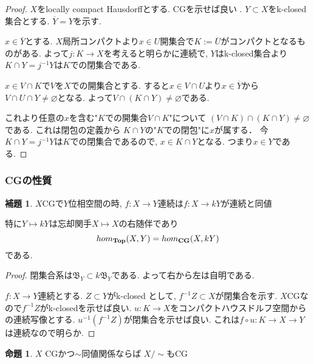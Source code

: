 \documentclass[dvipdfmx,a4paper,11pt]{report}
\theoremstyle{definition}
\newtheorem{lem}[thm]{補題}
\newtheorem{prop}[thm]{命題}
\begin{document}
\begin{proof}
 $X$をlocally compact Hausdorffとする.
CGを示せば良い .
$Y \subset X$をk-closed集合とする.
$\overline{Y} = Y$を示す.

$x \in \overline{Y}$とする.
$X$局所コンパクトより$x \in U$開集合で$K:= \overline{U}$がコンパクトとなるものがある.
よって$j : K \to X$を考えると明らかに連続で, $Y$はk-closed集合より$K\cap Y = j^{-1}Y$は$K$での閉集合である.

$x \in V \cap K$で$V$を$X$での開集合とする.
すると$x \in V \cap U$より$x \in \overline{Y}$から
$V \cap U \cap Y \neq\varnothing$となる.
よって$V \cap (K \cap Y)\neq\varnothing$である.

これより任意の$x$を含む"$K$での開集合$V \cap K$"について
$(V \cap K) \cap  (K \cap Y) \neq \varnothing$である.
これは閉包の定義から
$K \cap Y$の"$K$での閉包"に$x$が属する．
今$K\cap Y = j^{-1}Y$は$K$での閉集合であるので, $x \in K \cap Y$となる. 
つまり$x \in Y$である. 
\end{proof}


\subsubsection{CGの性質}


 \begin{tcolorbox}
 [colback = white, colframe = green!35!black, fonttitle = \bfseries,breakable = true]
\begin{lem}\cite[Cor1.10]{Str}
\label{Str-cor1.10}
$X$CGで$Y$位相空間の時, 
$f : X \to Y$連続は$f : X \to kY$が連続と同値

特に$Y \mapsto kY$は忘却関手$X \mapsto X$の右随伴であり
$$
hom_{{\bf Top}}(X, Y) = hom_{{\bf CG}}(X, kY)
$$
である. 
\end{lem}
\end{tcolorbox}

\begin{proof}
閉集合系は$\mathfrak{B}_Y \subset k\mathfrak{B}_Y$である.
よって右から左は自明である.

$f : X \to Y$連続とする. $Z \subset Y$がk-closed として, $f^{-1}Z \subset X$が閉集合を示す.
$X$CGなので$f^{-1}Z$がk-closedを示せば良い.
$u : K \to X$をコンパクトハウスドルフ空間からの連続写像とする.
$u^{-1}(f^{-1}Z )$が閉集合を示せば良い. これは$f \circ u : K \to X \to Y$は連続なので明らか.
\end{proof}




 \begin{tcolorbox}
 [colback = white, colframe = green!35!black, fonttitle = \bfseries,breakable = true]
\begin{prop}\cite[Prop2.1]{Str}
\label{Str-prop2.1}
$X$ CGかつ$\sim$同値関係ならば
$X/\sim$もCG
\end{prop}
\end{tcolorbox}
\end{document}
